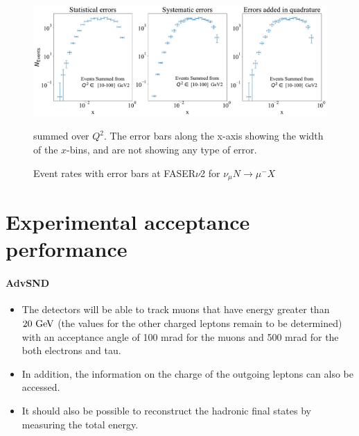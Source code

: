 \documentclass[11pt,a4paper]{article}
\numberwithin{equation}{section}
\numberwithin{figure}{section}
\numberwithin{table}{section}
\begin{document}
\begin{figure}[h]
    \centering
    \includegraphics[width = 1\textwidth]{error_plot_FASERv2_14.pdf}
    \caption{Event rates with error bars at FASER$\nu$2 for $\nu_{\mu} N \rightarrow \mu^- X$} summed over $Q^2$. The error bars along the x-axis showing the width of the $x$-bins, and are not showing any type of error.
    \label{fig:my_label}
\end{figure}

\section{Experimental acceptance performance} 

\paragraph{AdvSND} 
\begin{itemize}
    \item The detectors will be able to track muons that have energy greater
    than $20~\rm{GeV}$ (the values for the other charged leptons remain to be
    determined) with an acceptance angle of 100 mrad for the muons and 
    500 mrad for the both electrons and tau.
    \item In addition, the information on the charge of the outgoing leptons
    can also be accessed.
    \item It should also be possible to reconstruct the hadronic final states
    by measuring the total energy.
\end{itemize}
\end{document}
